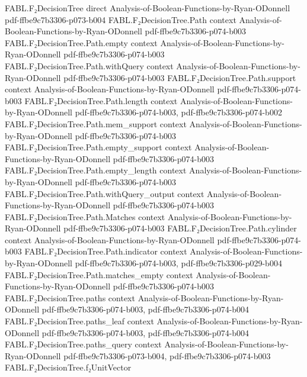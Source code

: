 \begin{theorem}
  {FABL.F₂DecisionTree}
  {direct}
  {Analysis-of-Boolean-Functions-by-Ryan-ODonnell}
  {pdf-ffbe9c7b3306-p073-b004}
\proofstep
  {FABL.F₂DecisionTree.Path}
  {context}
  {Analysis-of-Boolean-Functions-by-Ryan-ODonnell}
  {pdf-ffbe9c7b3306-p074-b003}
\proofstep
  {FABL.F₂DecisionTree.Path.empty}
  {context}
  {Analysis-of-Boolean-Functions-by-Ryan-ODonnell}
  {pdf-ffbe9c7b3306-p074-b003}
\proofstep
  {FABL.F₂DecisionTree.Path.withQuery}
  {context}
  {Analysis-of-Boolean-Functions-by-Ryan-ODonnell}
  {pdf-ffbe9c7b3306-p074-b003}
\proofstep
  {FABL.F₂DecisionTree.Path.support}
  {context}
  {Analysis-of-Boolean-Functions-by-Ryan-ODonnell}
  {pdf-ffbe9c7b3306-p074-b003}
\proofstep
  {FABL.F₂DecisionTree.Path.length}
  {context}
  {Analysis-of-Boolean-Functions-by-Ryan-ODonnell}
  {pdf-ffbe9c7b3306-p074-b003,
    pdf-ffbe9c7b3306-p074-b002}
\proofstep
  {FABL.F₂DecisionTree.Path.mem_support}
  {context}
  {Analysis-of-Boolean-Functions-by-Ryan-ODonnell}
  {pdf-ffbe9c7b3306-p074-b003}
\proofstep
  {FABL.F₂DecisionTree.Path.empty_support}
  {context}
  {Analysis-of-Boolean-Functions-by-Ryan-ODonnell}
  {pdf-ffbe9c7b3306-p074-b003}
\proofstep
  {FABL.F₂DecisionTree.Path.empty_length}
  {context}
  {Analysis-of-Boolean-Functions-by-Ryan-ODonnell}
  {pdf-ffbe9c7b3306-p074-b003}
\proofstep
  {FABL.F₂DecisionTree.Path.withQuery_output}
  {context}
  {Analysis-of-Boolean-Functions-by-Ryan-ODonnell}
  {pdf-ffbe9c7b3306-p074-b003}
\proofstep
  {FABL.F₂DecisionTree.Path.Matches}
  {context}
  {Analysis-of-Boolean-Functions-by-Ryan-ODonnell}
  {pdf-ffbe9c7b3306-p074-b003}
\proofstep
  {FABL.F₂DecisionTree.Path.cylinder}
  {context}
  {Analysis-of-Boolean-Functions-by-Ryan-ODonnell}
  {pdf-ffbe9c7b3306-p074-b003}
\proofstep
  {FABL.F₂DecisionTree.Path.indicator}
  {context}
  {Analysis-of-Boolean-Functions-by-Ryan-ODonnell}
  {pdf-ffbe9c7b3306-p074-b003,
    pdf-ffbe9c7b3306-p029-b004}
\proofstep
  {FABL.F₂DecisionTree.Path.matches_empty}
  {context}
  {Analysis-of-Boolean-Functions-by-Ryan-ODonnell}
  {pdf-ffbe9c7b3306-p074-b003}
\proofstep
  {FABL.F₂DecisionTree.paths}
  {context}
  {Analysis-of-Boolean-Functions-by-Ryan-ODonnell}
  {pdf-ffbe9c7b3306-p074-b003,
    pdf-ffbe9c7b3306-p074-b004}
\proofstep
  {FABL.F₂DecisionTree.paths_leaf}
  {context}
  {Analysis-of-Boolean-Functions-by-Ryan-ODonnell}
  {pdf-ffbe9c7b3306-p074-b003,
    pdf-ffbe9c7b3306-p074-b004}
\proofstep
  {FABL.F₂DecisionTree.paths_query}
  {context}
  {Analysis-of-Boolean-Functions-by-Ryan-ODonnell}
  {pdf-ffbe9c7b3306-p073-b004,
    pdf-ffbe9c7b3306-p074-b003}
\proofstep
  {FABL.F₂DecisionTree.f₂UnitVector}

\end{theorem}
